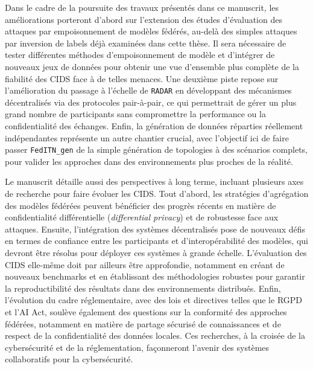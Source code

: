 Dans le cadre de la poursuite des travaux présentés dans ce manuscrit, les améliorations porteront d'abord sur l'extension des études d'évaluation des attaques par empoisonnement de modèles fédérés, au-delà des simples attaques par inversion de labels déjà examinées dans cette thèse.
Il sera nécessaire de tester différentes méthodes d'empoisonnement de modèle et d'intégrer de nouveaux jeux de données pour obtenir une vue d'ensemble plus complète de la fiabilité des CIDS face à de telles menaces.
Une deuxième piste repose sur l'amélioration du passage à l'échelle de \texttt{RADAR} en développant des mécanismes décentralisés via des protocoles pair-à-pair, ce qui permettrait de gérer un plus grand nombre de participants sans compromettre la performance ou la confidentialité des échanges.
Enfin, la génération de données réparties réellement indépendantes représente un autre chantier crucial, avec l'objectif ici de faire passer \verb|FedITN_gen| de la simple génération de topologies à des scénarios complets, pour valider les approches dans des environnements plus proches de la réalité.

Le manuscrit détaille aussi des perspectives à long terme, incluant plusieurs axes de recherche pour faire évoluer les CIDS.
Tout d’abord, les stratégies d’agrégation des modèles fédérées peuvent bénéficier des progrès récents en matière de confidentialité différentielle (\emph{differential privacy}) et de robustesse face aux attaques.
Ensuite, l’intégration des systèmes décentralisés pose de nouveaux défis en termes de confiance entre les participants et d’interopérabilité des modèles, qui devront être résolus pour déployer ces systèmes à grande échelle.
L’évaluation des CIDS elle-même doit par ailleurs être approfondie, notamment en créant de nouveaux benchmarks et en établissant des méthodologies robustes pour garantir la reproductibilité des résultats dans des environnements distribués.
Enfin, l’évolution du cadre réglementaire, avec des lois et directives telles que le RGPD et l'AI Act, soulève également des questions sur la conformité des approches fédérées, notamment en matière de partage sécurisé de connaissances et de respect de la confidentialité des données locales.
Ces recherches, à la croisée de la cybersécurité et de la réglementation, façonneront l'avenir des systèmes collaboratifs pour la cybersécurité.